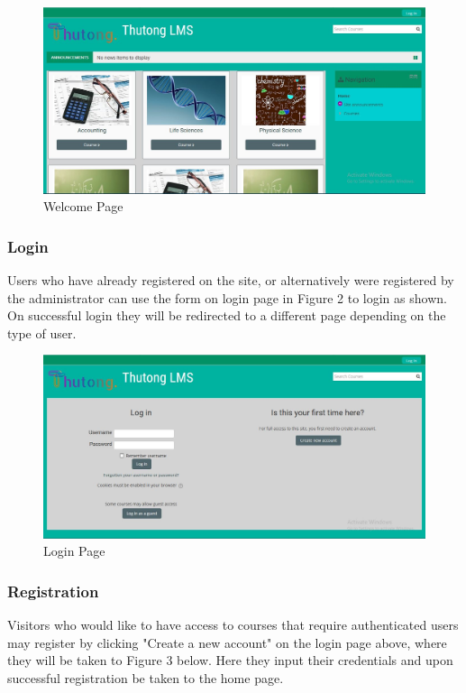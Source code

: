 \documentclass[12pt,a4paper]{article}
\begin{document}
			\begin{figure}[h]
				\centering
				\includegraphics[width=1\textwidth]{images/welcome.JPG}
				\caption{Welcome Page}
				\label{Figure 1}
			\end{figure}
			
			\subsubsection{Login}
				Users who have already registered on the site, or alternatively were registered by the administrator can use the form on login page in Figure 2 to login as shown. On successful login they will be redirected to a different page depending on the type of user.
				
				\begin{figure}[h]
					\centering
					\includegraphics[width=1\textwidth]{images/login.JPG}
					\caption{Login Page}
					\label{Figure 2}
				\end{figure}
			
			\subsubsection{Registration}
				Visitors who would like to have access to courses that require authenticated users may register by clicking "Create a new account" on the login page above, where they will be taken to Figure 3 below. Here they input their credentials and upon successful registration be taken to the home page.
				
\end{document}
